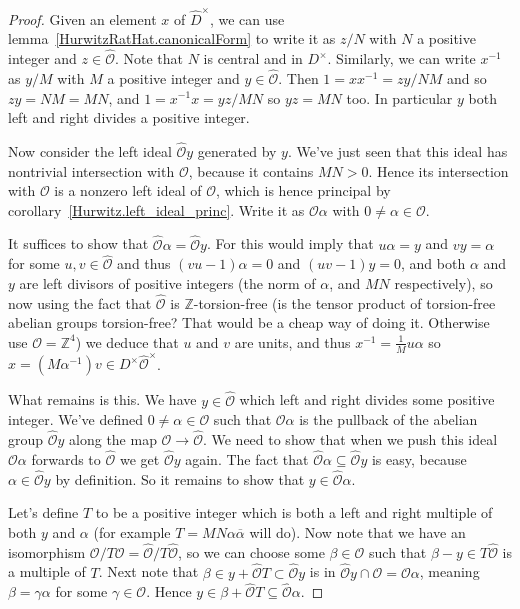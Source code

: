 \documentclass[10pt,a4paper]{article}
\newcommand{\Z}{\mathbb{Z}}
\newcommand{\calO}{\mathcal{O}}
\newcommand{\calOhat}{\widehat{\calO}}
\begin{document}
\begin{proof}
    Given an element $x$ of $\widehat{D}^\times$, we can use lemma~\ref{HurwitzRatHat.canonicalForm}
    to write it as $z/N$ with $N$ a positive integer
    and $z\in\widehat{\calO}$. Note that $N$ is central and in $D^\times$. Similarly, we can
    write $x^{-1}$ as $y/M$ with $M$ a positive integer and $y\in\widehat{\calO}$. Then
    $1=xx^{-1}=zy/NM$ and so $zy=NM=MN$, and $1=x^{-1}x=yz/MN$ so $yz=MN$ too. In particular $y$
    both left and right divides a positive integer.

    Now consider the left ideal $\widehat{\calO}y$ generated by $y$. We've just seen that
    this ideal has nontrivial intersection with $\calO$, because it contains $MN>0$. Hence
    its intersection with $\calO$ is a nonzero left ideal of $\calO$, which is
    hence principal by corollary~\ref{Hurwitz.left_ideal_princ}. Write it as $\calO\alpha$
    with $0\not=\alpha\in\calO$.

    It suffices to show that $\calOhat\alpha=\calOhat y$. For this would imply that
    $u\alpha=y$ and $vy=\alpha$ for some $u,v\in\calOhat$ and thus $(vu-1)\alpha=0$
    and $(uv-1)y=0$, and both $\alpha$ and $y$ are left divisors of positive integers
    (the norm of $\alpha$, and $MN$ respectively), so now using the fact that $\calOhat$
    is $\Z$-torsion-free (is the tensor product of torsion-free abelian groups torsion-free? That
    would be a cheap way of doing it. Otherwise use $\calO=\Z^4$) we deduce that $u$ and $v$
    are units, and thus $x^{-1}=\frac{1}{M}u\alpha$ so $x=(M\alpha^{-1})v\in D^\times\calOhat^\times$.

    What remains is this. We have $y\in\calOhat$ which left and right divides some positive integer.
    We've defined $0\not=\alpha\in\calO$ such that $\calO\alpha$ is the pullback of the
    abelian group $\calOhat y$ along the map $\calO\to\calOhat$. We need to show that when we push
    this ideal $\calO\alpha$ forwards to $\calOhat$ we get $\calOhat y$ again. The fact that
    $\calOhat\alpha\subseteq\calOhat y$ is easy, because $\alpha\in\calOhat y$ by definition.
    So it remains to show that $y\in\calOhat\alpha$.

    Let's define $T$ to be a positive integer which is both a left and right multiple of
    both $y$ and $\alpha$ (for example $T=MN\alpha\overline{\alpha}$ will do). Now note that we
    have an isomorphism $\calO/T\calO=\calOhat/T\calOhat$, so we can choose
    some $\beta\in\calO$ such that $\beta-y\in T\calOhat$ is a multiple of $T$. Next note that
    $\beta\in y+\calOhat T\subset \calOhat y$ is in $\calOhat y\cap\calO=\calO\alpha$, meaning
    $\beta=\gamma\alpha$ for some $\gamma\in\calO$.
    Hence $y\in\beta+\calOhat T\subseteq\calOhat\alpha$.
\end{proof}
\end{document}
